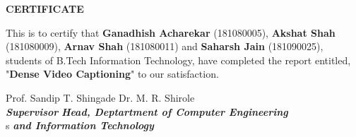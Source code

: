 \begin{center}
    {\textbf{CERTIFICATE}}\\ \vspace{1cm}
\end{center}
This is to certify that \textbf{Ganadhish Acharekar} (181080005), \textbf{Akshat Shah} (181080009), \textbf{Arnav Shah} (181080011) and \textbf{Saharsh Jain} (181090025), students of B.Tech Information Technology, have completed the report entitled, "\textbf{Dense Video Captioning}" to our satisfaction.

\vspace{2cm}
Prof. Sandip T. Shingade
\hfill
Dr. M. R. Shirole \\
\indent \textit{\textbf{Supervisor}}
\hfill
\textit{\textbf{Head, Deptartment of Computer Engineering}} \\
\color{white} s
\hfill
\color{black}\textit{\textbf{and Information Technology}} \par

 \par